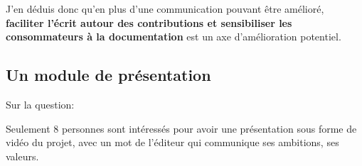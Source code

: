 			\begin{center}
				\textit{
				}
			\end{center}

			J'en déduis donc qu'en plus d'une communication pouvant être amélioré, \textbf{faciliter l'écrit autour des contributions et sensibiliser les consommateurs à la documentation} est un axe d'amélioration potentiel.

		\subsection{Un module de présentation}

			Sur la question:

			\begin{center}
				\textit{
				}
			\end{center}

			Seulement 8 personnes sont intéressés pour avoir une présentation sous forme de vidéo du projet, avec un mot de l'éditeur qui communique ses ambitions, ses valeurs.

